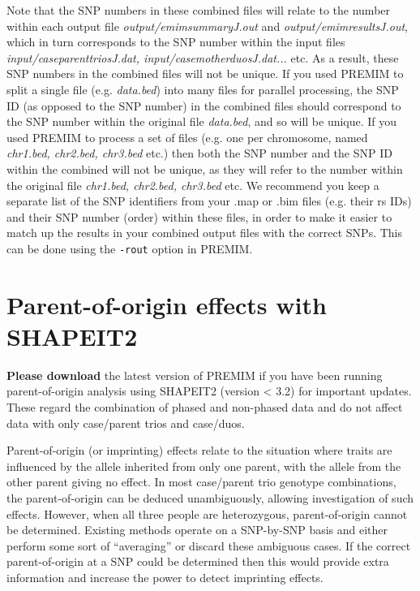 \documentclass[a4paper,12pt]{article}
\newcommand{\code}[1]{{\footnotesize{{\tt #1}}}}
\begin{document}
\begin{enumerate}
\begin{lstlisting}
\end{lstlisting} \vspace{0.35cm}Note that the SNP numbers in these combined files will relate to the number within each output file {\it output/emimsummaryJ.out} and {\it output/emimresultsJ.out}, which in turn corresponds to the SNP number within the input files {\it input/caseparenttriosJ.dat, input/casemotherduosJ.dat...} etc. As a result, these SNP numbers in the combined files will not be unique. If you used PREMIM to split a single file (e.g. {\it data.bed}) into many files for parallel processing, the SNP ID (as opposed to the SNP number) in the combined files should correspond to the SNP number within the original file {\it data.bed}, and so will be unique. If you used PREMIM to process a set of files (e.g. one per chromosome, named {\it chr1.bed, chr2.bed, chr3.bed} etc.) then both the SNP number and the SNP ID within the combined will not be unique, as they will refer to the number within the original file {\it chr1.bed, chr2.bed, chr3.bed} etc. We recommend you keep a separate list of the SNP identifiers from your .map or .bim files (e.g. their rs IDs) and their SNP number (order) within these files, in order to make it easier to match up the results in your combined output files with the correct SNPs. This can be done using the \code{-rout} option in PREMIM.\end{enumerate}


\section{Parent-of-origin effects with SHAPEIT2}
\label{poo}

{\bf Please download} the latest version of PREMIM if you have been running parent-of-origin analysis using SHAPEIT2 (version < 3.2) for important updates. These regard the combination of phased and non-phased data and do not affect data with only case/parent trios and case/duos. 

Parent-of-origin (or imprinting) effects relate to the situation where traits are influenced by the allele inherited from only one parent, with the allele from the other parent giving no effect. In most case/parent trio genotype combinations, the parent-of-origin can be deduced unambiguously, allowing investigation of such effects. However, when all three people are heterozygous, parent-of-origin cannot be determined. Existing methods operate on a SNP-by-SNP basis and either perform some sort of ``averaging'' or discard these ambiguous cases. If the correct parent-of-origin at a SNP could be determined then this would provide extra information and increase the power to detect imprinting effects. 
\end{document}
